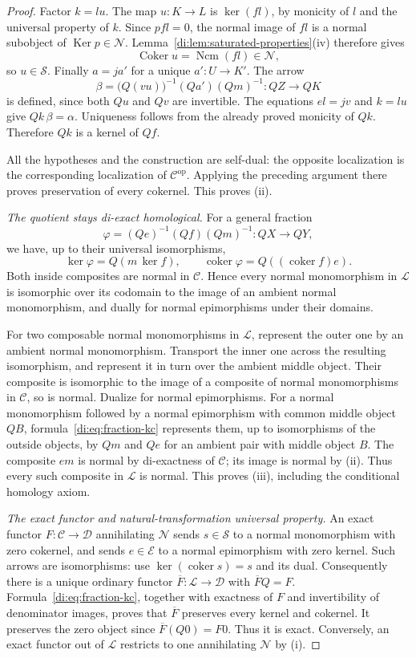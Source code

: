 \documentclass[11pt,reqno,a4paper]{amsart}
\theoremstyle{definition}
\theoremstyle{remark}
\DeclareMathOperator{\coker}{coker}
\newcommand{\C}{\mathcal{C}}
\newcommand{\D}{\mathcal{D}}
\newcommand{\N}{\mathcal{N}}
\newcommand{\0}{\mathbf{0}}
\renewcommand{\1}{\mathbf{1}}
\def\phi{\varphi}
\DeclareMathOperator{\Ker}{Ker}
\DeclareMathOperator{\Coker}{Coker}
\newcommand{\Ncm}{\operatorname{Ncm}}
\newcommand{\Sden}{\mathcal S}
\newcommand{\Eden}{\mathcal E}
\newcommand{\Loc}{\mathcal L}
\begin{document}
\begin{proof}
Factor $k=lu$. The map $u:K\to L$ is $\ker(fl)$, by monicity of $l$ and the universal property of $k$. Since $pfl=0$, the normal image of $fl$ is a normal subobject of $\Ker p\in\N$. Lemma~\ref{di:lem:saturated-properties}(iv) therefore gives
\[
 \Coker u=\Ncm(fl)\in\N,
\]
so $u\in\Sden$. Finally $a=ja'$ for a unique $a':U\to K'$. The arrow
\[
 \beta=\bigl(Q(vu)\bigr)^{-1}(Qa')(Qm)^{-1}:QZ\longrightarrow QK
\]
is defined, since both $Qu$ and $Qv$ are invertible. The equations $el=jv$ and $k=lu$ give $Qk\,\beta=\alpha$. Uniqueness follows from the already proved monicity of $Qk$. Therefore $Qk$ is a kernel of $Qf$.

All the hypotheses and the construction are self-dual: the opposite localization is the corresponding localization of $\C^{\mathrm{op}}$. Applying the preceding argument there proves preservation of every cokernel. This proves (ii).

\smallskip\noindent\emph{The quotient stays di-exact homological.}
For a general fraction
\[
 \phi=(Qe)^{-1}(Qf)(Qm)^{-1}:QX\longrightarrow QY,
\]
we have, up to their universal isomorphisms,
\begin{equation}\label{di:eq:fraction-kc}
 \ker\phi=Q(m\,\ker f),\qquad
 \coker\phi=Q((\coker f)e).
\end{equation}
Both inside composites are normal in $\C$. Hence every normal monomorphism in $\Loc$ is isomorphic over its codomain to the image of an ambient normal monomorphism, and dually for normal epimorphisms under their domains.

For two composable normal monomorphisms in $\Loc$, represent the outer one by an ambient normal monomorphism. Transport the inner one across the resulting isomorphism, and represent it in turn over the ambient middle object. Their composite is isomorphic to the image of a composite of normal monomorphisms in $\C$, so is normal. Dualize for normal epimorphisms. For a normal monomorphism followed by a normal epimorphism with common middle object $QB$, formula~\eqref{di:eq:fraction-kc} represents them, up to isomorphisms of the outside objects, by $Qm$ and $Qe$ for an ambient pair with middle object $B$. The composite $em$ is normal by di-exactness of $\C$; its image is normal by (ii). Thus every such composite in $\Loc$ is normal. This proves (iii), including the conditional homology axiom.

\smallskip\noindent\emph{The exact functor and natural-transformation universal property.}
An exact functor $F:\C\to\D$ annihilating $\N$ sends $s\in\Sden$ to a normal monomorphism with zero cokernel, and sends $e\in\Eden$ to a normal epimorphism with zero kernel. Such arrows are isomorphisms: use $\ker(\coker s)=s$ and its dual. Consequently there is a unique ordinary functor $\overline F:\Loc\to\D$ with $\overline FQ=F$. Formula~\eqref{di:eq:fraction-kc}, together with exactness of $F$ and invertibility of denominator images, proves that $\overline F$ preserves every kernel and cokernel. It preserves the zero object since $\overline F(Q0)=F0$. Thus it is exact. Conversely, an exact functor out of $\Loc$ restricts to one annihilating $\N$ by (i).


\end{proof}
\end{document}
